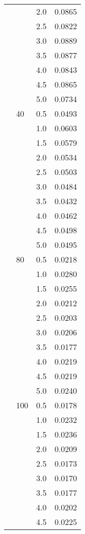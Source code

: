 \begin{tabular}{lllr}
          &     & 2.0 & 0.0865 \\
          &     & 2.5 & 0.0822 \\
          &     & 3.0 & 0.0889 \\
          &     & 3.5 & 0.0877 \\
          &     & 4.0 & 0.0843 \\
          &     & 4.5 & 0.0865 \\
          &     & 5.0 & 0.0734 \\
          & 40  & 0.5 & 0.0493 \\
          &     & 1.0 & 0.0603 \\
          &     & 1.5 & 0.0579 \\
          &     & 2.0 & 0.0534 \\
          &     & 2.5 & 0.0503 \\
          &     & 3.0 & 0.0484 \\
          &     & 3.5 & 0.0432 \\
          &     & 4.0 & 0.0462 \\
          &     & 4.5 & 0.0498 \\
          &     & 5.0 & 0.0495 \\
          & 80  & 0.5 & 0.0218 \\
          &     & 1.0 & 0.0280 \\
          &     & 1.5 & 0.0255 \\
          &     & 2.0 & 0.0212 \\
          &     & 2.5 & 0.0203 \\
          &     & 3.0 & 0.0206 \\
          &     & 3.5 & 0.0177 \\
          &     & 4.0 & 0.0219 \\
          &     & 4.5 & 0.0219 \\
          &     & 5.0 & 0.0240 \\
          & 100 & 0.5 & 0.0178 \\
          &     & 1.0 & 0.0232 \\
          &     & 1.5 & 0.0236 \\
          &     & 2.0 & 0.0209 \\
          &     & 2.5 & 0.0173 \\
          &     & 3.0 & 0.0170 \\
          &     & 3.5 & 0.0177 \\
          &     & 4.0 & 0.0202 \\
          &     & 4.5 & 0.0225 \\

\end{tabular}
